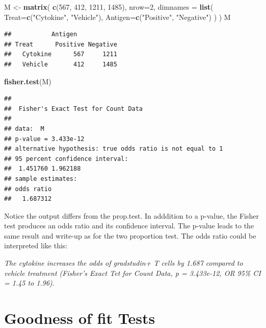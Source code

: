 \documentclass[]{book}
\newenvironment{Shaded}{\begin{snugshade}}{\end{snugshade}}
\newcommand{\DataTypeTok}[1]{\textcolor[rgb]{0.13,0.29,0.53}{#1}}
\newcommand{\DecValTok}[1]{\textcolor[rgb]{0.00,0.00,0.81}{#1}}
\newcommand{\KeywordTok}[1]{\textcolor[rgb]{0.13,0.29,0.53}{\textbf{#1}}}
\newcommand{\NormalTok}[1]{#1}
\newcommand{\StringTok}[1]{\textcolor[rgb]{0.31,0.60,0.02}{#1}}
\begin{document}
\begin{Shaded}
\begin{Highlighting}[]
\NormalTok{M <-}\StringTok{ }\KeywordTok{matrix}\NormalTok{(}
  \KeywordTok{c}\NormalTok{(}\DecValTok{567}\NormalTok{, }\DecValTok{412}\NormalTok{, }\DecValTok{1211}\NormalTok{, }\DecValTok{1485}\NormalTok{), }
  \DataTypeTok{nrow=}\DecValTok{2}\NormalTok{, }
  \DataTypeTok{dimnames =} \KeywordTok{list}\NormalTok{(}
    \DataTypeTok{Treat=}\KeywordTok{c}\NormalTok{(}\StringTok{"Cytokine"}\NormalTok{, }\StringTok{"Vehicle"}\NormalTok{), }
    \DataTypeTok{Antigen=}\KeywordTok{c}\NormalTok{(}\StringTok{"Positive"}\NormalTok{, }\StringTok{"Negative"}\NormalTok{)}
\NormalTok{    )}
\NormalTok{  )}
\NormalTok{M}
\end{Highlighting}
\end{Shaded}

\begin{verbatim}
##           Antigen
## Treat      Positive Negative
##   Cytokine      567     1211
##   Vehicle       412     1485
\end{verbatim}

\begin{Shaded}
\begin{Highlighting}[]
\KeywordTok{fisher.test}\NormalTok{(M)}
\end{Highlighting}
\end{Shaded}

\begin{verbatim}
## 
##  Fisher's Exact Test for Count Data
## 
## data:  M
## p-value = 3.433e-12
## alternative hypothesis: true odds ratio is not equal to 1
## 95 percent confidence interval:
##  1.451760 1.962188
## sample estimates:
## odds ratio 
##   1.687312
\end{verbatim}

Notice the output differs from the prop.test. In adddition to a p-value, the Fisher test produces an odds ratio and its confidence interval. The p-value leads to the same result and write-up as for the two proportion test. The odds ratio could be interpreted like this:

\emph{The cytokine increases the odds of gradstudin+ T cells by 1.687 compared to vehicle treatment (Fisher's Exact Tet for Count Data, p = 3.433e-12, OR 95\% CI = 1.45 to 1.96)}.

\hypertarget{goodness-of-fit-tests}{%
\section{Goodness of fit Tests}\label{goodness-of-fit-tests}}
\end{document}
